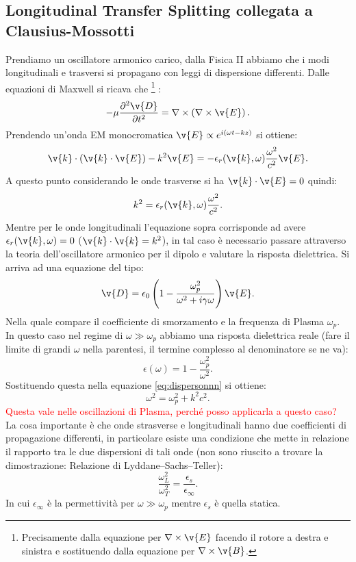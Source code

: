 \subsection{Longitudinal Transfer Splitting collegata a Clausius-Mossotti}%
\label{subsub:Longitudinal Transfer Splitting collegata a Clausius-Mossotti}
Prendiamo un oscillatore armonico carico, dalla Fisica II abbiamo che i modi longitudinali e trasversi si propagano con leggi di dispersione differenti. Dalle equazioni di Maxwell si ricava che
\footnote{Precisamente dalla equazione per $\nabla \times \v{E}$ facendo il rotore a destra e sinistra e sostituendo dalla equazione per $\nabla \times \v{B}$.}
:
\[
    -\mu \frac{\partial ^2\v{D}}{\partial t^2} = \nabla \times \left(\nabla \times \v{E}\right)
.\] 
Prendendo un'onda EM monocromatica $\v{E} \propto e^{i\left(\omega t-kz\right)}$ si ottiene:
\[
    \v{k}\cdot \left(\v{k}\cdot \v{E}\right)-k^2\v{E}=-\epsilon_r(\v{k},\omega) \frac{\omega^2}{c^2}\v{E}
.\] 
A questo punto considerando le onde trasverse si ha $\v{k}\cdot \v{E}=0$ quindi:
\[
    k^2=\epsilon_r(\v{k},\omega) \frac{\omega^2}{c^2} \label{eq:dispersonnn}
.\] 
Mentre per le onde longitudinali l'equazione sopra corrisponde ad avere $\epsilon_r(\v{k},\omega) =0$ ($\v{k}\cdot \v{k}=k^2$), in tal caso è necessario passare attraverso la teoria dell'oscillatore armonico per il dipolo e valutare la risposta dielettrica. Si arriva ad una equazione del tipo:
\[
    \v{D}=\epsilon_0\left(1-\frac{\omega_p^2}{\omega^2+i\gamma\omega}\right)\v{E}
.\] 
Nella quale compare il coefficiente di smorzamento e la frequenza di Plasma $\omega_p$. In questo caso nel regime di $\omega\gg \omega_p$ abbiamo una risposta dielettrica reale (fare il limite di grandi $\omega$ nella parentesi, il termine complesso al denominatore se ne va):
\[
    \epsilon (\omega) = 1-\frac{\omega_p^2}{\omega^2}
.\] 
Sostituendo questa nella equazione \ref{eq:dispersonnn} si ottiene:
\[
    \omega^2=\omega^2_p+k^2c^2
.\] 
\textcolor{red}{Questa vale nelle oscillazioni di Plasma, perché posso applicarla a questo caso?}\\
La cosa importante è che onde strasverse e longitudinali hanno due coefficienti di propagazione differenti, in particolare esiste una condizione che mette in relazione il rapporto tra le due dispersioni di tali onde (non sono riuscito a trovare la dimostrazione: Relazione di Lyddane–Sachs–Teller):
\[
    \frac{\omega_L^2}{\omega_T^2} = \frac{\epsilon_s}{\epsilon_\infty}
.\] 
In cui $\epsilon_\infty$ è la permettività per $\omega\gg \omega_p$ mentre $\epsilon_s$ è quella statica. \\
